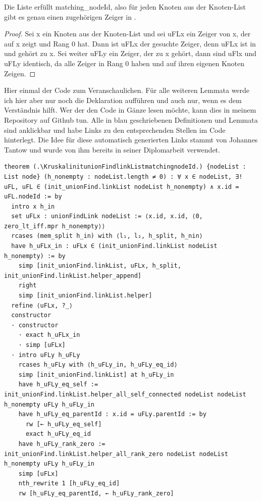 \begin{lemma}[\KruskalinitunionFindlinkListmatchingnodeId]
  Die Liste \KruskalinitunionFindlinkList erfüllt matching\_nodeId, also für jeden Knoten aus der Knoten-List gibt es genau einen zugehörigen Zeiger in \KruskalinitunionFindlinkList.
\end{lemma}
\begin{proof}
  Sei x ein Knoten aus der Knoten-List und sei uFLx ein Zeiger von x, der auf x zeigt und Rang 0 hat.
  Dann ist uFLx der gesuchte Zeiger,
  denn uFLx ist in \KruskalinitunionFindlinkList und gehört zu x.
  Sei weiter uFLy ein Zeiger, der zu x gehört, dann sind uFlx und uFLy identisch,
  da alle Zeiger in \KruskalinitunionFindlinkList Rang 0 haben und auf ihren eigenen Knoten Zeigen.
\end{proof}

Hier einmal der Code zum Veranschaulichen.
Für alle weiteren Lemmata werde ich hier aber nur noch die Deklaration aufführen und auch nur, wenn es dem Verständnis hilft.
Wer der den Code in Gänze lesen möchte, kann dies in meinem Repository\cite{mein_repo} auf Github tun.
Alle in blau geschriebenen Definitionen und Lemmata sind anklickbar und habe Links zu den entsprechenden Stellen im Code hinterlegt.
Die Idee für diese automatisch generierten Links stammt von Johannes Tantow und wurde von ihm bereits in seiner Diplomarbeit\cite{tantow_diplomarbeit} verwendet.

\newpage
\begin{lstlisting}
theorem (.\KruskalinitunionFindlinkListmatchingnodeId.) {nodeList : List node} (h_nonempty : nodeList.length ≠ 0) : ∀ x ∈ nodeList, ∃! uFL, uFL ∈ (init_unionFind.linkList nodeList h_nonempty) ∧ x.id = uFL.nodeId := by
  intro x h_in
  set uFLx : unionFindLink nodeList := ⟨x.id, x.id, ⟨0, zero_lt_iff.mpr h_nonempty⟩⟩
  rcases (mem_split h_in) with ⟨l₁, l₂, h_split, h_nin⟩
  have h_uFLx_in : uFLx ∈ (init_unionFind.linkList nodeList h_nonempty) := by
    simp [init_unionFind.linkList, uFLx, h_split, init_unionFind.linkList.helper_append]
    right
    simp [init_unionFind.linkList.helper]
  refine ⟨uFLx, ?_⟩
  constructor
  · constructor
    · exact h_uFLx_in
    · simp [uFLx]
  · intro uFLy h_uFLy
    rcases h_uFLy with ⟨h_uFLy_in, h_uFLy_eq_id⟩
    simp [init_unionFind.linkList] at h_uFLy_in
    have h_uFLy_eq_self := init_unionFind.linkList.helper_all_self_connected nodeList nodeList h_nonempty uFLy h_uFLy_in
    have h_uFLy_eq_parentId : x.id = uFLy.parentId := by
      rw [← h_uFLy_eq_self]
      exact h_uFLy_eq_id
    have h_uFLy_rank_zero := init_unionFind.linkList.helper_all_rank_zero nodeList nodeList h_nonempty uFLy h_uFLy_in
    simp [uFLx]
    nth_rewrite 1 [h_uFLy_eq_id]
    rw [h_uFLy_eq_parentId, ← h_uFLy_rank_zero]
  \end{lstlisting}


